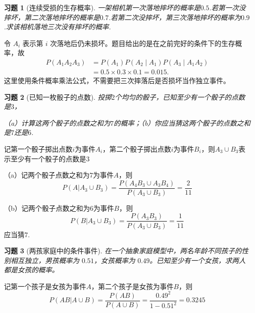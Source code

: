 \documentclass[12pt,fontset=fandol]{ctexart}
\newtheorem{exercise}{习题}[section]
\begin{document}
\begin{exercise}[连续受损的生存概率]\label{q:Y2.12}
一架相机第一次落地摔坏的概率是$0.5$.若第一次没摔坏，第二次落地摔坏的概率是$0.7$.若第二次没摔坏，第三次落地摔坏的概率为$0.9$.求该相机落地三次没有摔坏的概率.\par{}
\end{exercise}

\begin{solve}\label{a:Y2.12}令 $A_i$ 表示第 $i$ 次落地后仍未损坏。题目给出的是在之前完好的条件下的生存概率，故\[\begin{aligned}P(A_1A_2A_3)&=P(A_1)P(A_2\mid A_1)P(A_3\mid A_1A_2)\\&=0.5\times0.3\times0.1=0.015.\end{aligned}\]这里使用条件概率乘法公式，不需要把三次摔落后是否损坏当作独立事件。\end{solve}

\begin{exercise}[已知一枚骰子的点数]\label{q:Y2.13}
投掷$2$个均匀的骰子，已知至少有一个骰子的点数是$3$，

（a）计算这两个骰子的点数之和为$7$的概率；（b）你应当猜这两个骰子的点数之和是$7$还是$6$.\par{}
\end{exercise}

\begin{solve}\label{a:Y2.13}
记第一个骰子掷出点数$i$为事件$A_i$，第二个骰子掷出点数$i$为事件$B_i$，则$A_3\cup B_3$表示至少有一个骰子的点数是$3$

（a）记两个骰子点数之和为$7$为事件$A$，则
\[P(A|{A_3} \cup {B_3}) = \frac{{P({A_4}{B_3} \cup {A_3}{B_4})}}{{P({A_3} \cup {B_3})}} = \frac{2}{{11}}\]

（b）记两个骰子点数之和为$6$为事件$B$，则
\[P(B|{A_3} \cup {B_3}) = \frac{{P({A_3}{B_3})}}{{P({A_3} \cup {B_3})}} = \frac{1}{{11}}\]
应当猜$7$.
\end{solve}

\begin{exercise}[两孩家庭中的条件事件]\label{q:Y2.15}
在一个抽象家庭模型中，两名年龄不同孩子的性别相互独立，男孩概率为 $0.51$，女孩概率为 $0.49$。已知至少有一个女孩，求两人都是女孩的概率。\par{}
\end{exercise}

\begin{solve}\label{a:Y2.15}
记第一个孩子是女孩为事件$A$，第二个孩子是女孩为事件$B$，则
\[P(AB|A \cup B) = \frac{{P(AB)}}{{P(A \cup B)}} = \frac{{{{0.49}^2}}}{{1 - {{0.51}^2}}} = 0.3245\]
\end{solve}
\end{document}
